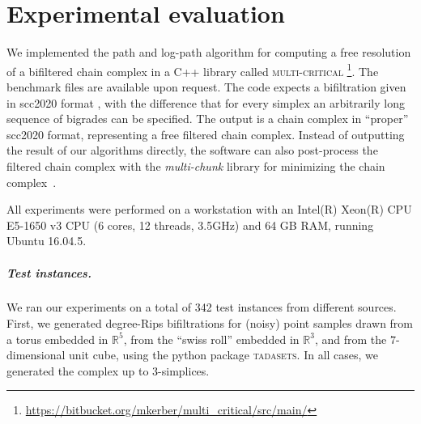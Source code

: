 \documentclass[a4paper,UKenglish,cleveref,nolineno,autoref]{socg-lipics-v2021}
\newcommand{\ignore}[1]{}
\newcommand{\R}{\mathbb{R}}
\begin{document}
\section{Experimental evaluation}
\label{sec:experiments}
%
We implemented the path and log-path algorithm for computing a free resolution
of a bifiltered chain complex 
in a C++ library called \textsc{multi-critical} \footnote{\url{https://bitbucket.org/mkerber/multi_critical/src/main/}}. The benchmark files are available upon request.  
The code expects a bifiltration given in
scc2020 format \cite{scc2020}%
, with the difference that for every simplex an arbitrarily long
sequence of bigrades can be specified.
The output is a chain complex in ``proper''
scc2020 format, representing a free filtered chain complex.
Instead
of outputting the result of our algorithms directly, the software can also
post-process the filtered chain complex with the \emph{multi-chunk} \cite{multi_chunk}
library for minimizing the chain complex~\cite{fk-chunk,fkr-compression}. 

All experiments were performed on a workstation with an Intel(R) Xeon(R) CPU E5-1650 v3 CPU (6 cores, 12 threads, 3.5GHz) and 64 GB RAM, running Ubuntu 16.04.5.

\subparagraph{Test instances.}
%
We ran our experiments on a total of 342 test instances from different
sources.
First, we generated degree-Rips bifiltrations
for (noisy) point samples drawn from a torus
embedded in $\R^5$, from the ``swiss roll'' embedded in $\R^3$,
and from the $7$-dimensional unit cube, using the python package \textsc{tadasets}.
In all cases, we generated the complex up to $3$-simplices.
\ignore{
We also included \emph{compressed} degree-Rips bifiltrations in our experiments
which are currently researched in a parallel project~\cite{anonymous}.
The idea of the approach is that generators of $0$- and $1$-simplices
in the deg-Rips complex can be simplified (i.e., their criticality is reduced)
without changing the homology of the complex. This allowed us to consider instances with more
points; however, since the results were qualitatively similar to the full degree-Rips case,
we do not give details outcomes on the compressed instances in present paper.
}
\end{document}
